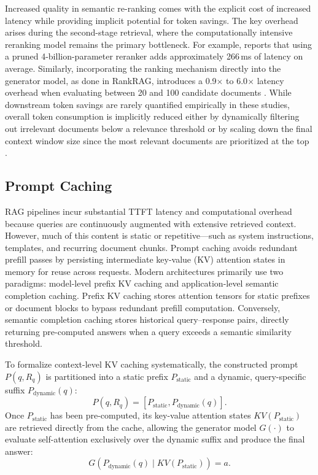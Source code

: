 Increased quality in semantic re-ranking comes with the explicit cost of increased latency while providing implicit potential for token savings. The key overhead arises during the second-stage retrieval, where the computationally intensive reranking model remains the primary bottleneck. For example, \citet{moreira2024enhancing} reports that using a pruned 4-billion-parameter reranker adds approximately 266\,ms of latency on average. Similarly, incorporating the ranking mechanism directly into the generator model, as done in RankRAG, introduces a 0.9$\times$ to 6.0$\times$ latency overhead when evaluating between 20 and 100 candidate documents \citep{yu2024rankrag}. While downstream token savings are rarely quantified empirically in these studies, overall token consumption is implicitly reduced either by dynamically filtering out irrelevant documents below a relevance threshold \citep{wang2025infogain} or by scaling down the final context window size since the most relevant documents are prioritized at the top \citep{yu2024rankrag}.


\subsection{Prompt Caching}
\label{lit:caching}

RAG pipelines incur substantial TTFT latency and computational overhead because queries are continuously augmented with extensive retrieved context. However, much of this content is static or repetitive—such as system instructions, templates, and recurring document chunks. Prompt caching avoids redundant prefill passes by persisting intermediate key-value (KV) attention states in memory for reuse across requests. Modern architectures primarily use two paradigms: model-level prefix KV caching and application-level semantic completion caching. Prefix KV caching stores attention tensors for static prefixes or document blocks to bypass redundant prefill computation. Conversely, semantic completion caching stores historical query–response pairs, directly returning pre-computed answers when a query exceeds a semantic similarity threshold.

To formalize context-level KV caching systematically, the constructed prompt $P(q, R_q)$ is partitioned into a static prefix $P_{\text{static}}$ and a dynamic, query-specific suffix $P_{\text{dynamic}}(q)$:
\begin{equation}
P(q, R_q) = [P_{\text{static}}, P_{\text{dynamic}}(q)].
\end{equation}
Once $P_{\text{static}}$ has been pre-computed, its key-value attention states $KV(P_{\text{static}})$ are retrieved directly from the cache, allowing the generator model $G(\cdot)$ to evaluate self-attention exclusively over the dynamic suffix and produce the final answer:
\begin{equation}
G(P_{\text{dynamic}}(q) \mid KV(P_{\text{static}})) = a.
\end{equation}

